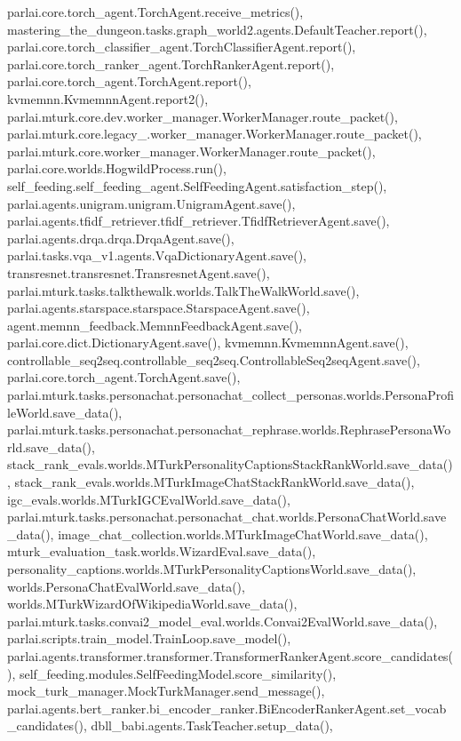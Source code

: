parlai.\+core.\+torch\+\_\+agent.\+Torch\+Agent.\+receive\+\_\+metrics(), mastering\+\_\+the\+\_\+dungeon.\+tasks.\+graph\+\_\+world2.\+agents.\+Default\+Teacher.\+report(), parlai.\+core.\+torch\+\_\+classifier\+\_\+agent.\+Torch\+Classifier\+Agent.\+report(), parlai.\+core.\+torch\+\_\+ranker\+\_\+agent.\+Torch\+Ranker\+Agent.\+report(), parlai.\+core.\+torch\+\_\+agent.\+Torch\+Agent.\+report(), kvmemnn.\+Kvmemnn\+Agent.\+report2(), parlai.\+mturk.\+core.\+dev.\+worker\+\_\+manager.\+Worker\+Manager.\+route\+\_\+packet(), parlai.\+mturk.\+core.\+legacy\+\_.\+worker\+\_\+manager.\+Worker\+Manager.\+route\+\_\+packet(), parlai.\+mturk.\+core.\+worker\+\_\+manager.\+Worker\+Manager.\+route\+\_\+packet(), parlai.\+core.\+worlds.\+Hogwild\+Process.\+run(), self\+\_\+feeding.\+self\+\_\+feeding\+\_\+agent.\+Self\+Feeding\+Agent.\+satisfaction\+\_\+step(), parlai.\+agents.\+unigram.\+unigram.\+Unigram\+Agent.\+save(), parlai.\+agents.\+tfidf\+\_\+retriever.\+tfidf\+\_\+retriever.\+Tfidf\+Retriever\+Agent.\+save(), parlai.\+agents.\+drqa.\+drqa.\+Drqa\+Agent.\+save(), parlai.\+tasks.\+vqa\+\_\+v1.\+agents.\+Vqa\+Dictionary\+Agent.\+save(), transresnet.\+transresnet.\+Transresnet\+Agent.\+save(), parlai.\+mturk.\+tasks.\+talkthewalk.\+worlds.\+Talk\+The\+Walk\+World.\+save(), parlai.\+agents.\+starspace.\+starspace.\+Starspace\+Agent.\+save(), agent.\+memnn\+\_\+feedback.\+Memnn\+Feedback\+Agent.\+save(), parlai.\+core.\+dict.\+Dictionary\+Agent.\+save(), kvmemnn.\+Kvmemnn\+Agent.\+save(), controllable\+\_\+seq2seq.\+controllable\+\_\+seq2seq.\+Controllable\+Seq2seq\+Agent.\+save(), parlai.\+core.\+torch\+\_\+agent.\+Torch\+Agent.\+save(), parlai.\+mturk.\+tasks.\+personachat.\+personachat\+\_\+collect\+\_\+personas.\+worlds.\+Persona\+Profile\+World.\+save\+\_\+data(), parlai.\+mturk.\+tasks.\+personachat.\+personachat\+\_\+rephrase.\+worlds.\+Rephrase\+Persona\+World.\+save\+\_\+data(), stack\+\_\+rank\+\_\+evals.\+worlds.\+M\+Turk\+Personality\+Captions\+Stack\+Rank\+World.\+save\+\_\+data(), stack\+\_\+rank\+\_\+evals.\+worlds.\+M\+Turk\+Image\+Chat\+Stack\+Rank\+World.\+save\+\_\+data(), igc\+\_\+evals.\+worlds.\+M\+Turk\+I\+G\+C\+Eval\+World.\+save\+\_\+data(), parlai.\+mturk.\+tasks.\+personachat.\+personachat\+\_\+chat.\+worlds.\+Persona\+Chat\+World.\+save\+\_\+data(), image\+\_\+chat\+\_\+collection.\+worlds.\+M\+Turk\+Image\+Chat\+World.\+save\+\_\+data(), mturk\+\_\+evaluation\+\_\+task.\+worlds.\+Wizard\+Eval.\+save\+\_\+data(), personality\+\_\+captions.\+worlds.\+M\+Turk\+Personality\+Captions\+World.\+save\+\_\+data(), worlds.\+Persona\+Chat\+Eval\+World.\+save\+\_\+data(), worlds.\+M\+Turk\+Wizard\+Of\+Wikipedia\+World.\+save\+\_\+data(), parlai.\+mturk.\+tasks.\+convai2\+\_\+model\+\_\+eval.\+worlds.\+Convai2\+Eval\+World.\+save\+\_\+data(), parlai.\+scripts.\+train\+\_\+model.\+Train\+Loop.\+save\+\_\+model(), parlai.\+agents.\+transformer.\+transformer.\+Transformer\+Ranker\+Agent.\+score\+\_\+candidates(), self\+\_\+feeding.\+modules.\+Self\+Feeding\+Model.\+score\+\_\+similarity(), mock\+\_\+turk\+\_\+manager.\+Mock\+Turk\+Manager.\+send\+\_\+message(), parlai.\+agents.\+bert\+\_\+ranker.\+bi\+\_\+encoder\+\_\+ranker.\+Bi\+Encoder\+Ranker\+Agent.\+set\+\_\+vocab\+\_\+candidates(), dbll\+\_\+babi.\+agents.\+Task\+Teacher.\+setup\+\_\+data(), 